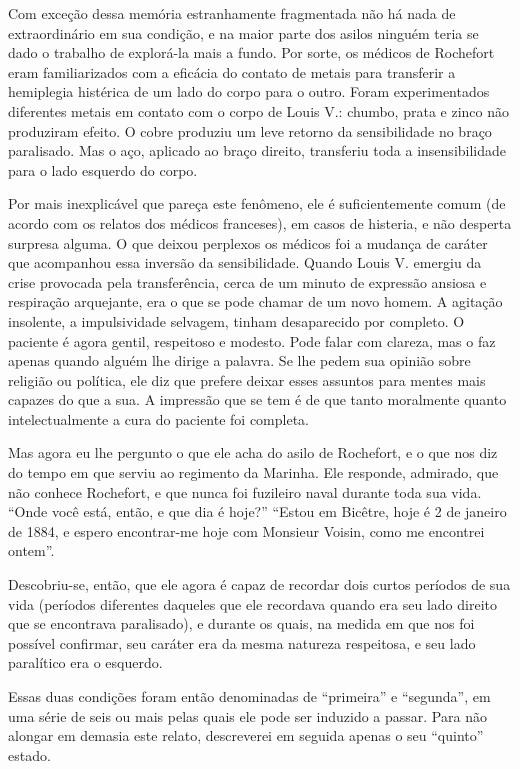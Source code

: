 Com exceção dessa memória estranhamente fragmentada não há nada de
extraordinário em sua condição, e na maior parte dos asilos ninguém
teria se dado o trabalho de explorá-la mais a fundo.  Por sorte, os
médicos de Rochefort eram familiarizados com a eficácia do contato de
metais para transferir a hemiplegia histérica de um lado do corpo para
o outro. Foram experimentados diferentes metais em contato com o corpo
de Louis V.: chumbo, prata e zinco não produziram efeito.  O cobre
produziu um leve retorno da sensibilidade no braço paralisado.  Mas o
aço, aplicado ao braço direito, transferiu toda a insensibilidade para
o lado esquerdo do corpo.

Por mais inexplicável que pareça este fenômeno, ele é suficientemente
comum (de acordo com os relatos dos médicos franceses), em casos de
histeria, e não desperta surpresa alguma.  O que deixou perplexos os
médicos foi a mudança de caráter que acompanhou essa inversão da
sensibilidade.  Quando Louis V. emergiu da crise provocada pela
transferência, cerca de um minuto de expressão ansiosa e respiração
arquejante, era o que se pode chamar de um novo homem.  A agitação
insolente, a impulsividade selvagem, tinham desaparecido por completo.
O paciente é agora gentil, respeitoso e modesto.  Pode falar com
clareza, mas o faz apenas quando alguém lhe dirige a palavra.  Se lhe
pedem sua opinião sobre religião ou política, ele diz que prefere
deixar esses assuntos para mentes mais capazes do que a sua. A
impressão que se tem é de que tanto moralmente quanto intelectualmente
a cura do paciente foi completa. 

Mas agora eu lhe pergunto o que ele acha do asilo de Rochefort, e o que
nos diz do tempo em que serviu ao regimento da Marinha. Ele responde,
admirado, que não conhece Rochefort, e que nunca foi fuzileiro naval
durante toda sua vida.  “Onde você está, então, e que dia é hoje?”
“Estou em Bicêtre, hoje é 2 de janeiro de 1884, e espero encontrar-me
hoje com Monsieur Voisin, como me encontrei ontem”.

Descobriu-se, então, que ele agora é capaz de recordar dois curtos
períodos de sua vida (períodos diferentes daqueles que ele recordava
quando era seu lado direito que se encontrava paralisado), e durante os
quais, na medida em que nos foi possível confirmar, seu caráter era da
mesma natureza respeitosa, e seu lado paralítico era o esquerdo.

Essas duas condições foram então denominadas de “primeira” e “segunda”,
em uma série de seis ou mais pelas quais ele pode ser induzido a
passar.  Para não alongar em demasia este relato, descreverei em
seguida apenas o seu “quinto” estado.

